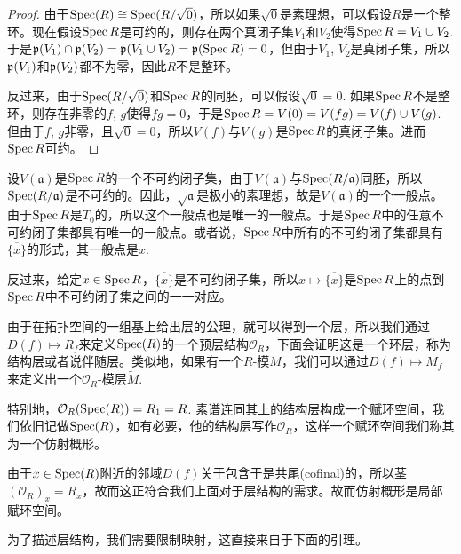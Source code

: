 \begin{proof}
由于$\operatorname{Spec}(R)\cong \operatorname{Spec}(R/\sqrt{0})$，所以如果$\sqrt{0}$是素理想，可以假设$R$是一个整环。现在假设$\operatorname{Spec} R$是可约的，则存在两个真闭子集$V_1$和$V_2$使得$\operatorname{Spec} R=V_1\cup V_2$. 于是$\mathfrak{p}(V_1)\cap \mathfrak{p}(V_2)=\mathfrak{p}(V_1\cup V_2)=\mathfrak{p} (\operatorname{Spec} R)=0$，但由于$V_1$, $V_2$是真闭子集，所以$\mathfrak{p}(V_1)$和$\mathfrak{p}(V_2)$都不为零，因此$R$不是整环。

反过来，由于$\operatorname{Spec}(R/\sqrt{0})$和$\operatorname{Spec} R$的同胚，可以假设$\sqrt{0}=0$. 如果$\operatorname{Spec} R$不是整环，则存在非零的$f$, $g$使得$fg=0$，于是$\operatorname{Spec} R=V(0)=V(fg)=V(f)\cup V(g)$. 但由于$f$, $g$非零，且$\sqrt{0}=0$，所以$V(f)$与$V(g)$是$\operatorname{Spec} R$的真闭子集。进而$\operatorname{Spec} R$可约。
\end{proof}

设$V(\mathfrak{a})$是$\operatorname{Spec} R$的一个不可约闭子集，由于$V(\mathfrak{a})$与$\operatorname{Spec} (R/\mathfrak{a})$同胚，所以$\operatorname{Spec} (R/\mathfrak{a})$是不可约的。因此，$\sqrt{\mathfrak{a}}$是极小的素理想，故是$V(\mathfrak{a})$的一个一般点。由于$\operatorname{Spec} R$是$T_0$的，所以这个一般点也是唯一的一般点。于是$\operatorname{Spec} R$中的任意不可约闭子集都具有唯一的一般点。或者说，$\operatorname{Spec} R$中所有的不可约闭子集都具有$\overline{\{x\}}$的形式，其一般点是$x$. 

反过来，给定$x\in\operatorname{Spec} R$，$\overline{\{x\}}$是不可约闭子集，所以$x\mapsto \overline{\{x\}}$是$\operatorname{Spec} R$上的点到$\operatorname{Spec} R$中不可约闭子集之间的一一对应。

\begin{para}
由于在拓扑空间的一组基上给出层的公理，就可以得到一个层，所以我们通过$D(f)\mapsto R_f$来定义$\operatorname{Spec}(R)$的一个预层结构$\mathcal{O}_R$，下面会证明这是一个环层，称为结构层或者说伴随层。类似地，如果有一个$R$-模$M$，我们可以通过$D(f)\mapsto M_f$来定义出一个$\mathcal{O}_R$-模层$\widetilde{M}$. 

特别地，$\mathcal{O}_R(\operatorname{Spec}(R))=R_1=R$. 素谱连同其上的结构层构成一个赋环空间，我们依旧记做$\operatorname{Spec}(R)$，如有必要，他的结构层写作$\mathcal{O}_R$，这样一个赋环空间我们称其为一个仿射概形。


由于$x\in \operatorname{Spec}(R)$附近的邻域$D(f)$关于包含于是共尾(cofinal)的，所以茎$(\mathcal{O}_{R})_x=R_x$，故而这正符合我们上面对于层结构的需求。故而仿射概形是局部赋环空间。
\end{para}

为了描述层结构，我们需要限制映射，这直接来自于下面的引理。

